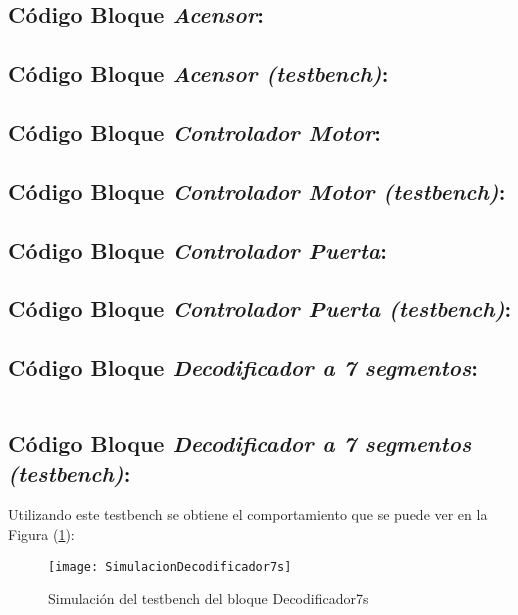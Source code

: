 \subsection{Código Bloque \textit{Acensor}:} \label{code:Acensor}

\subsection{Código Bloque \textit{Acensor (testbench)}:} \label{code:Acensor_tb}

\subsection{Código Bloque \textit{Controlador Motor}:} \label{code:ControladorMotor}

\subsection{Código Bloque \textit{Controlador Motor (testbench)}:} \label{code:ControladorMotor_tb}

\subsection{Código Bloque \textit{Controlador Puerta}:} \label{code:ControladorPuerta}

\subsection{Código Bloque \textit{Controlador Puerta (testbench)}:} \label{code:ControladorPuerta_tb}

\subsection{Código Bloque \textit{Decodificador a 7 segmentos}:} \label{code:Decodificador7s}
	\inputminted[frame=lines,fontsize=\footnotesize,linenos]{vhdl}{CodeFiles/Decodificador7s.vhd}

\subsection{Código Bloque \textit{Decodificador a 7 segmentos (testbench)}:} \label{code:Decodificador7s_tb}
	Utilizando este testbench se obtiene el comportamiento que se puede ver en la Figura (\ref{fig:SimulacionDecodificador7s}):

    \begin{figure}[H]
		    \centering
		    \texttt{[image: SimulacionDecodificador7s]}
		    \caption{Simulación del testbench del bloque Decodificador7s}
		    \label{fig:SimulacionDecodificador7s}
	\end{figure}
	\inputminted[frame=lines,fontsize=\footnotesize,linenos]{vhdl}{CodeFiles/Decodificador7s_tb.vhd}

